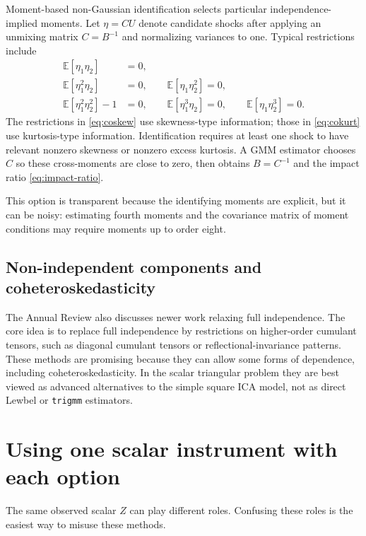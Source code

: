 \documentclass[11pt]{article}
\newcommand{\E}{\mathbb{E}}
\theoremstyle{plain}
\theoremstyle{definition}
\theoremstyle{remark}
\begin{document}
Moment-based non-Gaussian identification selects particular independence-implied
moments. Let $\eta=C U$ denote candidate shocks after applying an unmixing matrix
$C=B^{-1}$ and normalizing variances to one. Typical restrictions include
\begin{align}
\E[\eta_1\eta_2]&=0,
\label{eq:orthog}\\
\E[\eta_1^2\eta_2]&=0,
\qquad
\E[\eta_1\eta_2^2]=0,
\label{eq:coskew}\\
\E[\eta_1^2\eta_2^2]-1&=0,
\qquad
\E[\eta_1^3\eta_2]=0,
\qquad
\E[\eta_1\eta_2^3]=0.
\label{eq:cokurt}
\end{align}
The restrictions in \eqref{eq:coskew} use skewness-type information; those in
\eqref{eq:cokurt} use kurtosis-type information. Identification requires at
least one shock to have relevant nonzero skewness or nonzero excess kurtosis. A
GMM estimator chooses $C$ so these cross-moments are close to zero, then obtains
$B=C^{-1}$ and the impact ratio \eqref{eq:impact-ratio}.

This option is transparent because the identifying moments are explicit, but it
can be noisy: estimating fourth moments and the covariance matrix of moment
conditions may require moments up to order eight.

\subsection{Non-independent components and coheteroskedasticity}

The Annual Review also discusses newer work relaxing full independence. The core
idea is to replace full independence by restrictions on higher-order cumulant
tensors, such as diagonal cumulant tensors or reflectional-invariance patterns.
These methods are promising because they can allow some forms of dependence,
including coheteroskedasticity. In the scalar triangular problem they are best
viewed as advanced alternatives to the simple square ICA model, not as direct
Lewbel or \texttt{trigmm} estimators.

\section{Using one scalar instrument with each option}
\label{sec:singleZ}

The same observed scalar $Z$ can play different roles. Confusing these roles is
the easiest way to misuse these methods.
\end{document}
